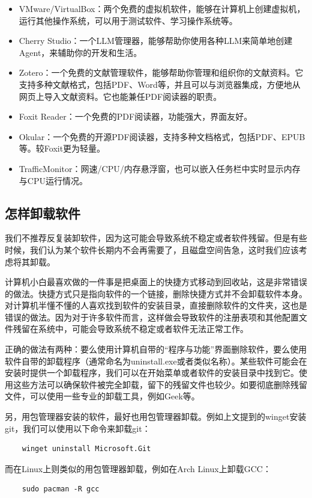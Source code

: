 \begin{itemize}
\begin{itemize}
      \item VMware/VirtualBox：两个免费的虚拟机软件，能够在计算机上创建虚拟机，运行其他操作系统，可以用于测试软件、学习操作系统等。
      \item Cherry Studio：一个LLM管理器，能够帮助你使用各种LLM来简单地创建Agent，来辅助你的开发和生活。
      \item Zotero：一个免费的文献管理软件，能够帮助你管理和组织你的文献资料。它支持多种文献格式，包括PDF、Word等，并且可以与浏览器集成，方便地从网页上导入文献资料。它也能兼任PDF阅读器的职责。
      \item Foxit Reader：一个免费的PDF阅读器，功能强大，界面友好。
      \item Okular：一个免费的开源PDF阅读器，支持多种文档格式，包括PDF、EPUB等。较Foxit更为轻量。
      \item TrafficMonitor：网速/CPU/内存悬浮窗，也可以嵌入任务栏中实时显示内存与CPU运行情况。
    \end{itemize}
\end{itemize}

\subsection{怎样卸载软件}

我们不推荐反复装卸软件，因为这可能会导致系统不稳定或者软件残留。但是有些时候，我们认为某个软件长期内不会再需要了，且磁盘空间告急，这时我们应该考虑将其卸载。

计算机小白最喜欢做的一件事是把桌面上的快捷方式移动到回收站，这是非常错误的做法。快捷方式只是指向软件的一个链接，删除快捷方式并不会卸载软件本身。对计算机半懂不懂的人喜欢找到软件的安装目录，直接删除软件的文件夹，这也是错误的做法。因为对于许多软件而言，这样做会导致软件的注册表项和其他配置文件残留在系统中，可能会导致系统不稳定或者软件无法正常工作。

正确的做法有两种：要么使用计算机自带的“程序与功能”界面删除软件，要么使用软件自带的卸载程序（通常命名为uninstall.exe或者类似名称）。某些软件可能会在安装时提供一个卸载程序，我们可以在开始菜单或者软件的安装目录中找到它。使用这些方法可以确保软件被完全卸载，留下的残留文件也较少。如要彻底删除残留文件，可以使用一些专业的卸载工具，例如Geek等。

另，用包管理器安装的软件，最好也用包管理器卸载。例如上文提到的winget安装git，我们可以使用以下命令来卸载git：
\begin{verbatim}
    winget uninstall Microsoft.Git
\end{verbatim}
而在Linux上则类似的用包管理器卸载，例如在Arch Linux上卸载GCC：
\begin{verbatim}
    sudo pacman -R gcc
\end{verbatim}

